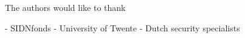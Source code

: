 \begin{acks}
	The authors would like to thank 

- SIDNfonds
- University of Twente
- Dutch security specialists 
\end{acks}
